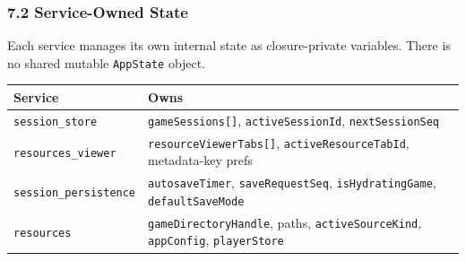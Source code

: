 \documentclass[]{article}
\begin{document}
\subsubsection{7.2 Service-Owned State}\label{service-owned-state}

Each service manages its own internal state as closure-private
variables. There is no shared mutable \texttt{AppState} object.

\begin{longtable}[]{@{}ll@{}}
\toprule
\begin{minipage}[b]{0.05\columnwidth}\raggedright\strut
Service\strut
\end{minipage} & \begin{minipage}[b]{0.05\columnwidth}\raggedright\strut
Owns\strut
\end{minipage}\tabularnewline
\midrule
\endhead
\begin{minipage}[t]{0.05\columnwidth}\raggedright\strut
\texttt{session\_store}\strut
\end{minipage} & \begin{minipage}[t]{0.05\columnwidth}\raggedright\strut
\texttt{gameSessions{[}{]}}, \texttt{activeSessionId},
\texttt{nextSessionSeq}\strut
\end{minipage}\tabularnewline
\begin{minipage}[t]{0.05\columnwidth}\raggedright\strut
\texttt{resources\_viewer}\strut
\end{minipage} & \begin{minipage}[t]{0.05\columnwidth}\raggedright\strut
\texttt{resourceViewerTabs{[}{]}}, \texttt{activeResourceTabId},
metadata-key prefs\strut
\end{minipage}\tabularnewline
\begin{minipage}[t]{0.05\columnwidth}\raggedright\strut
\texttt{session\_persistence}\strut
\end{minipage} & \begin{minipage}[t]{0.05\columnwidth}\raggedright\strut
\texttt{autosaveTimer}, \texttt{saveRequestSeq},
\texttt{isHydratingGame}, \texttt{defaultSaveMode}\strut
\end{minipage}\tabularnewline
\begin{minipage}[t]{0.05\columnwidth}\raggedright\strut
\texttt{resources}\strut
\end{minipage} & \begin{minipage}[t]{0.05\columnwidth}\raggedright\strut
\texttt{gameDirectoryHandle}, paths, \texttt{activeSourceKind},
\texttt{appConfig}, \texttt{playerStore}\strut
\end{minipage}\tabularnewline

\end{longtable}
\end{document}
